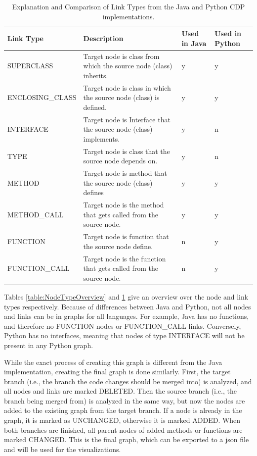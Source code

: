 \documentclass[a4paper,11pt,twoside]{article}
\theoremstyle{definition} %
\begin{document}
\begin{table}[h!]
\begin{center}
\begin{tabular}{m{4cm} | m{4.5cm} | m{2.4cm} | m{2.4cm}} 
 \hline
 \rowcolor{lightgray} Link Type & Description & Used in Java & Used in Python \\
 \hline
 SUPERCLASS & Target node is class from which the source node (class) inherits. & y & y \\
 \hline
 ENCLOSING\_CLASS & Target node is class in which the source node (class) is defined. & y & y \\
 \hline
 INTERFACE & Target node is Interface that the source node (class) implements. & y & n \\
 \hline
 TYPE & Target node is class that the source node depends on. & y & n \\
 \hline
 METHOD & Target node is method that the source node (class) defines & y & y \\
 \hline
 METHOD\_CALL & Target node is the method that gets called from the source node. & y & y \\
 \hline
 FUNCTION & Target node is function that the source node define. & n & y \\
 \hline
 FUNCTION\_CALL & Target node is the function that gets called from the source node. & n & y \\
 \hline
\end{tabular}
\end{center}
\caption{Explanation and Comparison of Link Types from the Java and Python CDP implementations.}
\label{table:LinkTypeOverview}
\end{table}

\newpage %

Tables \ref{table:NodeTypeOverview} and \ref{table:LinkTypeOverview} give an overview over the node and link types respectively. Because of differences between Java and Python, not all nodes and links can be in graphs for all languages. For example, Java has no functions, and therefore no FUNCTION nodes or FUNCTION\_CALL links. Conversely, Python has no interfaces, meaning that nodes of type INTERFACE will not be present in any Python graph.

While the exact process of creating this graph is different from the Java implementation, creating the final graph is done similarly. First, the target branch (i.e., the branch the code changes should be merged into) is analyzed, and all nodes and links are marked DELETED. Then the source branch (i.e., the branch being merged from) is analyzed in the same way, but now the nodes are added to the existing graph from the target branch. If a node is already in the graph, it is marked as UNCHANGED, otherwise it is marked ADDED. When both branches are finished, all parent nodes of added methods or functions are marked CHANGED. This is the final graph, which can be exported to a json file and will be used for the visualizations. 
\end{document}
